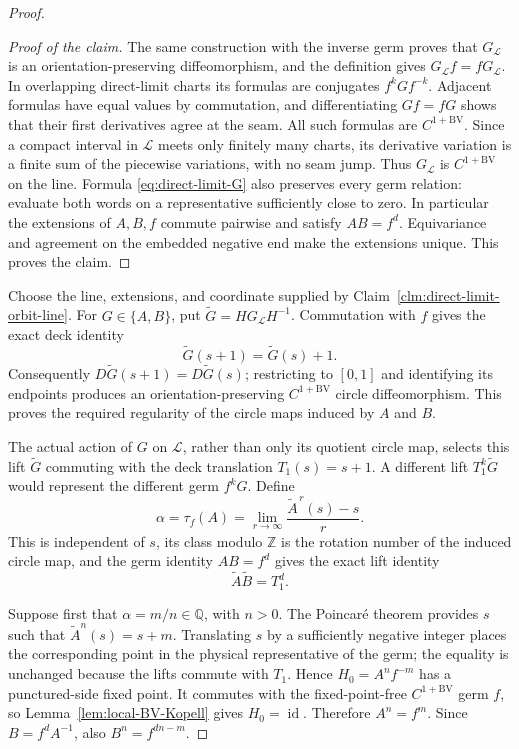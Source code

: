 \documentclass[11pt]{article}
\theoremstyle{definition}
\theoremstyle{remark}
\newcommand{\id}{\operatorname{id}}
\begin{document}
\begin{proof}
\begin{proof}[Proof of the claim]
The same construction with the inverse germ proves that
\(G_{\mathscr L}\) is an orientation-preserving diffeomorphism, and the
definition gives \(G_{\mathscr L}f=fG_{\mathscr L}\).  In overlapping
direct-limit charts its formulas are conjugates \(f^kGf^{-k}\).  Adjacent
formulas have equal values by commutation, and differentiating \(Gf=fG\)
shows that their first derivatives agree at the seam.  All such formulas
are \(C^{1+\mathrm{BV}}\).  Since a compact interval in \(\mathscr L\)
meets only finitely many charts, its derivative variation is a finite sum
of the piecewise variations, with no seam jump.  Thus \(G_{\mathscr L}\)
is \(C^{1+\mathrm{BV}}\) on the line.
Formula \eqref{eq:direct-limit-G} also preserves every germ relation:
evaluate both words on a representative sufficiently close to zero.  In
particular the extensions of \(A,B,f\) commute pairwise and satisfy
\(AB=f^d\).  Equivariance and agreement on the embedded negative end make
the extensions unique.  This proves the claim.
\end{proof}

Choose the line, extensions, and coordinate supplied by
Claim~\ref{clm:direct-limit-orbit-line}.  For \(G\in\{A,B\}\), put
\(\widetilde G=HG_{\mathscr L}H^{-1}\).  Commutation with \(f\) gives the
exact deck identity
\[
 \widetilde G(s+1)=\widetilde G(s)+1.
\]
Consequently \(D\widetilde G(s+1)=D\widetilde G(s)\); restricting to
\([0,1]\) and identifying its endpoints produces an orientation-preserving
\(C^{1+\mathrm{BV}}\) circle diffeomorphism.  This proves the required
regularity of the circle maps induced by \(A\) and \(B\).

The actual action of $G$ on $\mathscr L$, rather than only its quotient
circle map, selects this lift $\widetilde G$ commuting with the deck
translation $T_1(s)=s+1$.  A different lift $T_1^k\widetilde G$ would
represent the different germ $f^kG$.  Define
\[
 \alpha=\tau_f(A)=\lim_{r\to\infty}
       \frac{\widetilde A^{\,r}(s)-s}{r}.
\]
This is independent of $s$, its class modulo $\mathbb Z$ is the rotation
number of the induced circle map, and the germ identity $AB=f^d$ gives the
exact lift identity
\begin{equation}\label{eq:selected-lift-product}
 \widetilde A\widetilde B=T_1^d.
\end{equation}

Suppose first that $\alpha=m/n\in\mathbb Q$, with $n>0$.  The
Poincar\'e theorem provides $s$ such that
$\widetilde A^n(s)=s+m$.  Translating $s$ by a sufficiently negative integer
places the corresponding point in the physical representative of the germ;
the equality is unchanged because the lifts commute with $T_1$.  Hence
$H_0=A^nf^{-m}$ has a punctured-side fixed point.  It commutes with the
fixed-point-free $C^{1+\mathrm{BV}}$ germ $f$, so
Lemma~\ref{lem:local-BV-Kopell} gives $H_0=\id$.  Therefore
$A^n=f^m$.  Since $B=f^dA^{-1}$, also
$B^n=f^{dn-m}$.


\end{proof}
\end{document}
